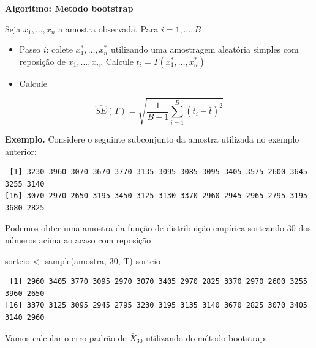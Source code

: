 \documentclass[
  letterpaper,
  DIV=11,
  numbers=noendperiod]{scrartcl}
\newenvironment{Shaded}{\begin{snugshade}}{\end{snugshade}}
\newcommand{\DecValTok}[1]{\textcolor[rgb]{0.68,0.00,0.00}{#1}}
\newcommand{\FunctionTok}[1]{\textcolor[rgb]{0.28,0.35,0.67}{#1}}
\newcommand{\NormalTok}[1]{\textcolor[rgb]{0.00,0.23,0.31}{#1}}
\newcommand{\OtherTok}[1]{\textcolor[rgb]{0.00,0.23,0.31}{#1}}
\newcommand{\SpecialCharTok}[1]{\textcolor[rgb]{0.37,0.37,0.37}{#1}}
\begin{document}
\textbf{Algoritmo: Metodo bootstrap}

Seja \(x_1,\ldots,x_n\) a amostra observada. Para \(i=1,\ldots,B\)

\begin{itemize}
\item
  Passo \(i\): colete \(x_1^*,\ldots,x_n^*\) utilizando uma amostragem
  aleatória simples com reposição de \(x_1,\ldots,x_n\). Calcule
  \(t_i=T(x_1^*,\ldots,x_n^*)\)
\item
  Calcule
\end{itemize}

\[\widehat{SE}(T)=\sqrt{\frac{1}{B-1}\sum_{i=1}^B(t_i-\bar{t})^2}\]

\textbf{Exemplo.} Considere o seguinte subconjunto da amostra utilizada
no exemplo anterior:

\begin{Shaded}
\end{Shaded}

\begin{verbatim}
 [1] 3230 3960 3070 3670 3770 3135 3095 3085 3095 3405 3575 2600 3645 3255 3140
[16] 3070 2970 2650 3195 3450 3125 3130 3370 2960 2945 2965 2795 3195 3680 2825
\end{verbatim}

Podemos obter uma amostra da função de distribuição empírica sorteando
30 dos números acima ao acaso com reposição

\begin{Shaded}
\begin{Highlighting}[]
\NormalTok{sorteio }\OtherTok{\textless{}{-}} \FunctionTok{sample}\NormalTok{(amostra, }\DecValTok{30}\NormalTok{, T)}
\NormalTok{sorteio}
\end{Highlighting}
\end{Shaded}

\begin{verbatim}
 [1] 2960 3405 3770 3095 2970 3070 3405 2970 2825 3370 2970 2600 3255 3960 2650
[16] 3370 3125 3095 2945 2795 3230 3195 3135 3140 3670 2825 3070 3405 3140 2960
\end{verbatim}

Vamos calcular o erro padrão de \(\bar{X}_{30}\) utilizando do método
bootstrap:
\end{document}
